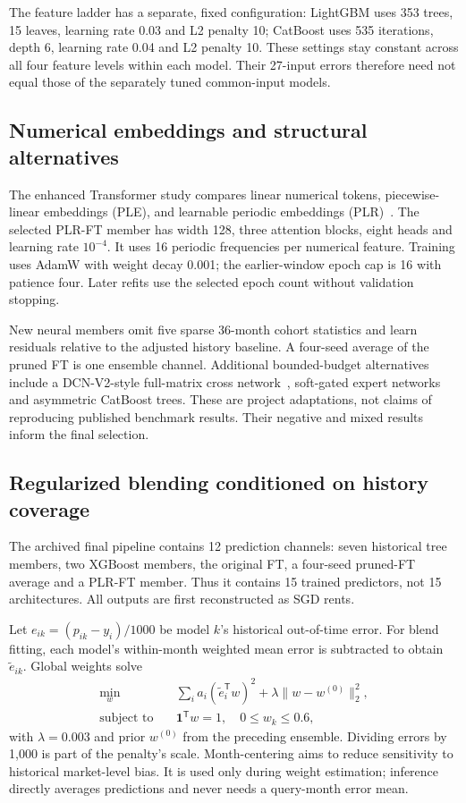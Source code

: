\documentclass[conference]{IEEEtran}
\begin{document}
The feature ladder has a separate, fixed configuration: LightGBM uses 353 trees, 15 leaves, learning rate 0.03 and L2 penalty 10; CatBoost uses 535 iterations, depth 6, learning rate 0.04 and L2 penalty 10. These settings stay constant across all four feature levels within each model. Their 27-input errors therefore need not equal those of the separately tuned common-input models.

\subsection{Numerical embeddings and structural alternatives}
The enhanced Transformer study compares linear numerical tokens, piecewise-linear embeddings (PLE), and learnable periodic embeddings (PLR)~\cite{numembed}. The selected PLR-FT member has width 128, three attention blocks, eight heads and learning rate $10^{-4}$. It uses 16 periodic frequencies per numerical feature. Training uses AdamW with weight decay 0.001; the earlier-window epoch cap is 16 with patience four. Later refits use the selected epoch count without validation stopping.

New neural members omit five sparse 36-month cohort statistics and learn residuals relative to the adjusted history baseline. A four-seed average of the pruned FT is one ensemble channel. Additional bounded-budget alternatives include a DCN-V2-style full-matrix cross network~\cite{dcn}, soft-gated expert networks and asymmetric CatBoost trees. These are project adaptations, not claims of reproducing published benchmark results. Their negative and mixed results inform the final selection.

\subsection{Regularized blending conditioned on history coverage}
The archived final pipeline contains 12 prediction channels: seven historical tree members, two XGBoost members, the original FT, a four-seed pruned-FT average and a PLR-FT member. Thus it contains 15 trained predictors, not 15 architectures. All outputs are first reconstructed as SGD rents.

Let $e_{ik}=(p_{ik}-y_i)/1000$ be model $k$'s historical out-of-time error. For blend fitting, each model's within-month weighted mean error is subtracted to obtain $\widetilde e_{ik}$. Global weights solve
\begin{equation}
\begin{aligned}
\min_w\quad &\sum_i a_i(\widetilde e_i^{\mathsf T}w)^2+
\lambda\|w-w^{(0)}\|_2^2,\\
\text{subject to}\quad &\mathbf{1}^{\mathsf T}w=1,\quad 0\leq w_k\leq0.6,
\end{aligned}
\label{eq:blend}
\end{equation}
with $\lambda=0.003$ and prior $w^{(0)}$ from the preceding ensemble. Dividing errors by 1,000 is part of the penalty's scale. Month-centering aims to reduce sensitivity to historical market-level bias. It is used only during weight estimation; inference directly averages predictions and never needs a query-month error mean.
\end{document}
